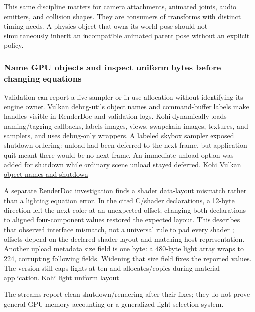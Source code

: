This same discipline matters for camera attachments, animated joints, audio emitters, and collision shapes. They are consumers of transforms with distinct timing needs. A physics object that owns its world pose should not simultaneously inherit an incompatible animated parent pose without an explicit policy.

\subsubsection{Name GPU objects and inspect uniform bytes before changing equations}\label{06-engine-ii-ch026-name-gpu-objects-and-inspect-uniform-bytes-before-changing-equations}

\hypertarget{06-engine-ii-ch026-name-gpu-objects-and-inspect-uniform-bytes-before-changing-equations}{}

Validation can report a live sampler or in-use allocation without identifying its engine owner. Vulkan debug-utils object names and command-buffer labels make handles visible in RenderDoc and validation logs. Kohi dynamically loads naming/tagging callbacks, labels images, views, swapchain images, textures, and samplers, and uses debug-only wrappers. A labeled skybox sampler exposed shutdown ordering: unload had been deferred to the next frame, but application quit meant there would be no next frame. An immediate-unload option was added for shutdown while ordinary scene unload stayed deferred. \href{https://www.youtube.com/watch?v=0ILGxLqvlsA}{Kohi Vulkan object names and shutdown}

A separate RenderDoc investigation finds a shader data-layout mismatch rather than a lighting equation error. In the cited C/shader declarations, a 12-byte  direction left the next  color at an unexpected offset; changing both declarations to aligned four-component values restored the expected layout. This describes that observed interface mismatch, not a universal rule to pad every shader ; offsets depend on the declared shader layout and matching host representation. Another upload metadata size field is one byte: a 480-byte light array wraps to 224, corrupting following fields. Widening that size field fixes the reported values. The version still caps lights at ten and allocates/copies during material application. \href{https://www.youtube.com/watch?v=nhEHfkiarV8}{Kohi light uniform layout}

The streams report clean shutdown/rendering after their fixes; they do not prove general GPU-memory accounting or a generalized light-selection system.

